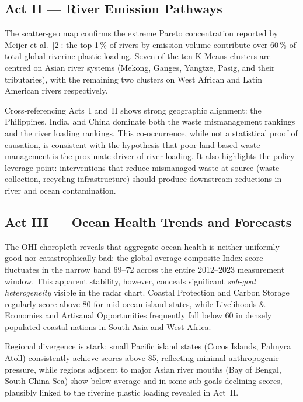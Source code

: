 \documentclass[10pt,twocolumn]{article}
\begin{document}
\subsection{Act II --- River Emission Pathways}

The scatter-geo map confirms the extreme Pareto concentration reported by
Meijer et al.\ [2]: the top 1\,\% of rivers by emission volume contribute
over 60\,\% of total global riverine plastic loading.
Seven of the ten K-Means clusters are centred on Asian river systems
(Mekong, Ganges, Yangtze, Pasig, and their tributaries), with the remaining
two clusters on West African and Latin American rivers respectively.

Cross-referencing Acts~I and~II shows strong geographic alignment:
the Philippines, India, and China dominate both the waste mismanagement
rankings and the river loading rankings.
This co-occurrence, while not a statistical proof of causation, is
consistent with the hypothesis that poor land-based waste management
is the proximate driver of river loading.
It also highlights the policy leverage point: interventions that reduce
mismanaged waste at source (waste collection, recycling infrastructure)
should produce downstream reductions in river and ocean contamination.

\subsection{Act III --- Ocean Health Trends and Forecasts}

The OHI choropleth reveals that aggregate ocean health is neither uniformly
good nor catastrophically bad: the global average composite Index score
fluctuates in the narrow band 69--72 across the entire 2012--2023 measurement
window.
This apparent stability, however, conceals significant \emph{sub-goal
heterogeneity} visible in the radar chart.
Coastal Protection and Carbon Storage regularly score above 80 for mid-ocean
island states, while Livelihoods \& Economies and Artisanal Opportunities
frequently fall below 60 in densely populated coastal nations in South Asia
and West Africa.

Regional divergence is stark: small Pacific island states (Cocos Islands,
Palmyra Atoll) consistently achieve scores above 85, reflecting minimal
anthropogenic pressure, while regions adjacent to major Asian river mouths
(Bay of Bengal, South China Sea) show below-average and in some sub-goals
declining scores, plausibly linked to the riverine plastic loading revealed
in Act~II.
\end{document}
